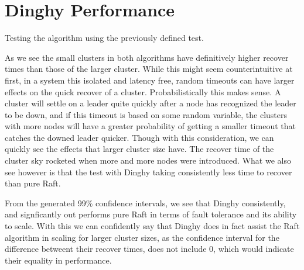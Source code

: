\section{Dinghy Performance}

Testing the algorithm using the previously defined test.


As we see the small clusters in both algorithms have definitively higher recover times than those of the larger cluster.
While this might seem counterintuitive at first, in a system this isolated and latency free, random timeouts can have larger effects on the quick recover of a cluster.
Probabilistically this makes sense. A cluster will settle on a leader quite quickly after a node has recognized the leader to be down, and if this timeout is based on some random variable, the clusters with more nodes will have a greater probability of getting a smaller timeout that catches the downed leader quicker.
Though with this consideration, we can quickly see the effects that larger cluster size have. The recover time of the cluster sky rocketed when more and more nodes were introduced.
What we also see however is that the test with Dinghy taking consistently less time to recover than pure Raft.

From the generated 99\% confidence intervals, we see that Dinghy consistently, and signficantly out performs pure Raft in terms of fault tolerance and its ability to scale. With this we can confidently say that Dinghy does in fact assist the Raft algorithm in scaling for larger cluster sizes, as the confidence interval for the difference betweent their recover times, does not include 0, which would indicate their equality in performance.



